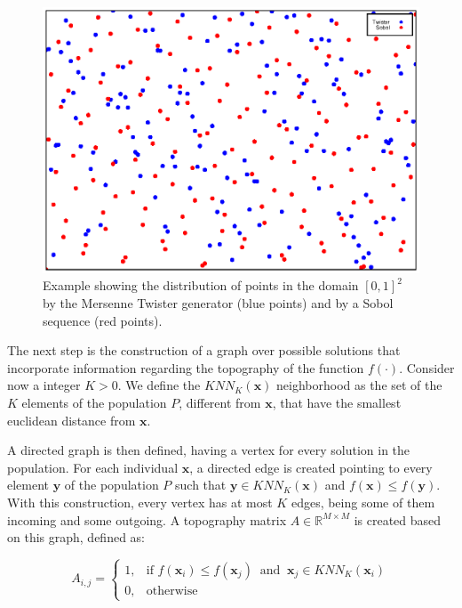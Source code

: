 \begin{figure}[h]
\begin{center}
\includegraphics{scatter.eps}
\end{center}
\captionsetup{justification=centering}
\caption{Example showing the distribution of points in the domain $[0, 1]^2$ by the Mersenne Twister generator (blue points) and by a Sobol sequence (red points). }\label{fig:Sobol}
\end{figure}


The next step is the construction of a graph over possible solutions that incorporate information regarding the topography of the function $f(\cdot)$. Consider now a integer $K > 0$. We define the $KNN_K(\bm{x})$ neighborhood as the set of the $K$ elements of the population $P$, different from $\bm{x}$, that have the smallest euclidean distance from $\bm{x}$.

A directed graph is then defined, having a vertex for every solution in the population. For each individual $\bm{x}$, a directed edge is created pointing to every element $\bm{y}$ of the population $P$ such that $\bm{y} \in KNN_K(\bm{x})$ and $f(\bm{x}) \leq f(\bm{y})$. With this construction, every vertex has at most $K$ edges, being some of them incoming and some outgoing. A topography matrix $A \in \mathbb{R}^{M \times M}$ is created based on this graph, defined as:


\[
    A_{i, j} = 
\begin{cases}
    1,& \text{if } f(\bm{x}_i) \leq f(\bm{x}_j) \ \text{ and } \ \bm{x}_j \in KNN_K(\bm{x}_i) \\
    0,& \text{otherwise}
\end{cases}
\]
\\[-1.5em]


